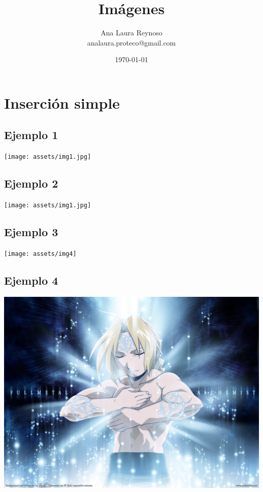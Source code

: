 \documentclass[letterpaper]{article}
\author{Ana Laura Reynoso \\ analaura.proteco@gmail.com}
\title{Imágenes }
\date{\today}
\begin{document}
	\maketitle
	\section{Inserción simple}
	
	\subsection{Ejemplo 1}
	\begin{flushright}
		\texttt{[image: assets/img1.jpg]} %
	\end{flushright}
	
	\subsection{Ejemplo 2}
	\texttt{[image: assets/img1.jpg]} %
	
	\subsection{Ejemplo 3}
	\texttt{[image: assets/img4]}
	
	\subsection{Ejemplo 4}
	\includegraphics[scale=0.2]{assets/img7}
	
\end{document}
